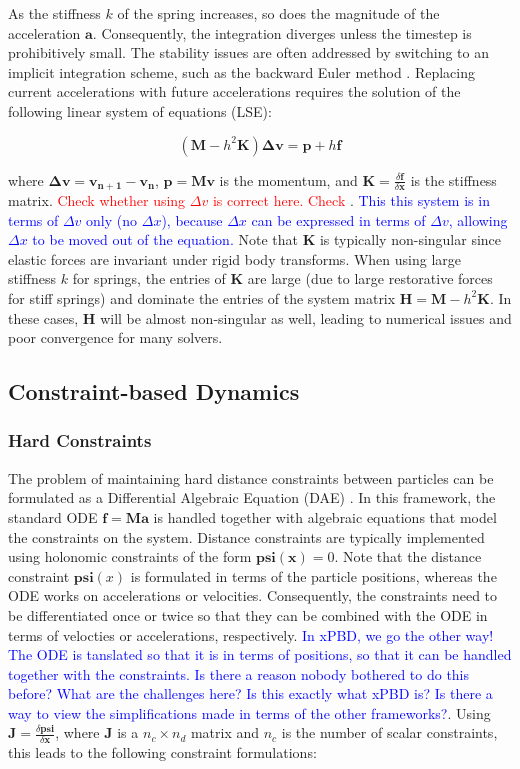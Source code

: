 \documentclass{article}
\begin{document}
As the stiffness $k$ of the spring increases, so does the magnitude of the acceleration $\bm{a}$. Consequently, the integration
diverges unless the timestep is prohibitively small. The stability issues are often addressed by switching to an implicit 
integration scheme, such as the backward Euler method \cite{baraff1998}. Replacing current accelerations with future accelerations
requires the solution of the following linear system of equations (LSE):

\[
    (\bm{M} - h^2\bm{K})\bm{\Delta v} = \bm{p} + h\bm{f}
\]

where $\bm{\Delta v} = \bm{v_{n+1}} - \bm{v_{n}}$, $\bm{p} = \bm{Mv}$ is the momentum, and $\bm{K} = \frac{\delta \bm{f}}{\delta \bm{x}}$ 
is the stiffness matrix. \textcolor{red}{Check whether using $\Delta v$ is correct here. Check \cite{baraff1998}}. \textcolor{blue}{This
this system is in terms of $\Delta v$ only (no $\Delta x$), because $\Delta x$ can be expressed in terms of $\Delta v$, allowing $\Delta x$ 
to be moved out of the equation.} Note that $\bm{K}$ is typically non-singular since elastic forces are invariant under rigid body 
transforms. When using large stiffness $k$ for springs, the entries of $\bm{K}$ are large (due to large restorative forces for stiff 
springs) and dominate the entries of the system matrix $\bm{H} = \bm{M} - h^2\bm{K}$. In these cases, $\bm{H}$ will be almost non-singular 
as well, leading to numerical issues and poor convergence for many solvers.

\subsection*{Constraint-based Dynamics}

\subsubsection*{Hard Constraints}
The problem of maintaining hard distance constraints between particles can be formulated as a Differential Algebraic Equation (DAE)
\cite{ascher1995, baraff1996}. In this framework, the standard ODE $\bm{f} = \bm{Ma}$ is handled together with algebraic equations 
that model the constraints on the system. Distance constraints are typically implemented using holonomic constraints of the form 
$\bm{psi(x)} = 0$. Note that the distance constraint $\bm{psi}(x)$ is formulated in terms of the particle positions, whereas the ODE
works on accelerations or velocities. Consequently, the constraints need to be differentiated once or twice so that they can be 
combined with the ODE in terms of velocties or accelerations, respectively. \textcolor{blue}{In xPBD, we go the other way! The ODE
is tanslated so that it is in terms of positions, so that it can be handled together with the constraints. Is there a reason nobody bothered to
do this before? What are the challenges here? Is this exactly what xPBD is? Is there a way to view the simplifications made in 
terms of the other frameworks?}. Using $\bm{J} = \frac{\delta \bm{psi}}{\delta \bm{x}}$, where $\bm{J}$ is a $n_c \times n_d$ matrix
and $n_c$ is the number of scalar constraints, this leads to the following constraint formulations:
\end{document}
